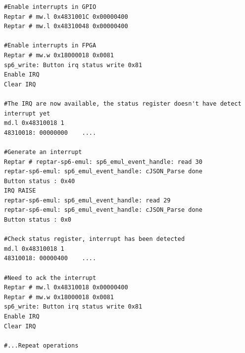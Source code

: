 \begin{lstlisting}
#Enable interrupts in GPIO
Reptar # mw.l 0x4831001C 0x00000400        
Reptar # mw.l 0x48310048 0x00000400  

#Enable interrupts in FPGA
Reptar # mw.w 0x18000018 0x0081
sp6_write: Button irq status write 0x81
Enable IRQ
Clear IRQ

#The IRQ are now available, the status register doesn't have detect interrupt yet
md.l 0x48310018 1
48310018: 00000000    ....

#Generate an interrupt
Reptar # reptar-sp6-emul: sp6_emul_event_handle: read 30 
reptar-sp6-emul: sp6_emul_event_handle: cJSON_Parse done 
Button status : 0x40
IRQ RAISE
reptar-sp6-emul: sp6_emul_event_handle: read 29 
reptar-sp6-emul: sp6_emul_event_handle: cJSON_Parse done 
Button status : 0x0

#Check status register, interrupt has been detected
md.l 0x48310018 1
48310018: 00000400    ....

#Need to ack the interrupt
Reptar # mw.l 0x48310018 0x00000400
Reptar # mw.w 0x18000018 0x0081
sp6_write: Button irq status write 0x81
Enable IRQ
Clear IRQ

#...Repeat operations
\end{lstlisting}
